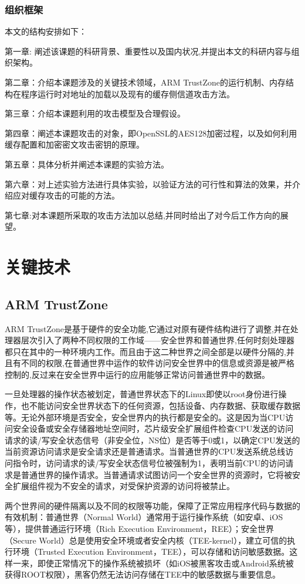\subsection{组织框架}
本文的结构安排如下：

第一章: 阐述该课题的科研背景、重要性以及国内状况,并提出本文的科研内容与组织架构。

第二章：介绍本课题涉及的关键技术领域，ARM TrustZone的运行机制、内存结构在程序运行时对地址的加载以及现有的缓存侧信道攻击方法。

第三章：介绍本课题利用的攻击模型及合理假设。

第四章：阐述本课题攻击的对象，即OpenSSL的AES128加密过程，以及如何利用缓存配置和加密密文攻击密钥的原理。

第五章：具体分析并阐述本课题的实验方法。

第六章：对上述实验方法进行具体实验，以验证方法的可行性和算法的效果，并介绍应对缓存攻击的可能的方法。

第七章:对本课题所采取的攻击方法加以总结,并同时给出了对今后工作方向的展望。
\chapter{关键技术}
\section{ARM TrustZone}
ARM TrustZone是基于硬件的安全功能,它通过对原有硬件结构进行了调整,并在处理器层次引入了两种不同权限的工作域——安全世界和普通世界,任何时刻处理器都只在其中的一种环境内工作。而且由于这二种世界之间全部是以硬件分隔的,并且有不同的权限,在普通世界中运作的软件访问安全世界中的信息或资源是被严格控制的,反过来在安全世界中运行的应用能够正常访问普通世界中的数据。

一旦处理器的操作状态被划定，普通世界状态下的Linux即使以root身份进行操作，也不能访问安全世界状态下的任何资源，包括设备、内存数据、获取缓存数据等。无论外部环境是否安全，安全世界内的执行都是安全的。这是因为当CPU访问安全设备或安全存储器地址空间时，芯片级安全扩展组件检查CPU发送的访问请求的读/写安全状态信号（非安全位，NS位）是否等于0或1，以确定CPU发送的当前资源访问请求是安全请求还是普通请求。当普通世界的CPU发送系统总线访问指令时，访问请求的读/写安全状态信号位被强制为1，表明当前CPU的访问请求是普通世界的操作请求。当普通请求试图访问一个安全世界的资源时，它将被安全扩展组件视为不安全的请求，对受保护资源的访问将被禁止。

两个世界间的硬件隔离以及不同的权限等功能，保障了正常应用程序代码与数据的有效机制：普通世界（Normal  World）通常用于运行操作系统（如安卓、iOS等），提供普通运行环境（Rich Execution Environment，REE）；安全世界（Secure World）总是使用安全环境或者安全内核（TEE-kernel），建立可信的执行环境（Trusted Execution Environment，TEE），可以存储和访问敏感数据。这样一来，即使正常情况下的操作系统被损坏（如iOS被黑客攻击或Android系统被获得ROOT权限），黑客仍然无法访问存储在TEE中的敏感数据与重要信息。

